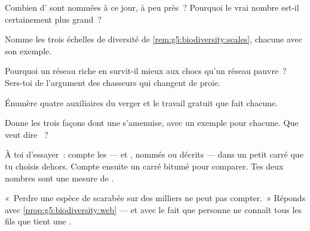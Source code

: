 \begin{exercise}[$\star$]\label{exo:g5:biodiversity:3}
Combien d' sont nommées à ce jour, à peu près~? Pourquoi le
vrai nombre est-il certainement plus grand~?
\end{exercise}

\begin{exercise}[$\star$]\label{exo:g5:biodiversity:4}
Nomme les trois échelles de diversité de
\cref{rem:g5:biodiversity:scales}, chacune avec son exemple.
\end{exercise}

\begin{exercise}[$\star$]\label{exo:g5:biodiversity:5}
Pourquoi un réseau riche en  survit-il mieux aux chocs qu'un
réseau pauvre~? Sers-toi de l'argument des chasseurs qui changent de
proie.
\end{exercise}

\begin{exercise}[$\star$]\label{exo:g5:biodiversity:6}
Énumère quatre  auxiliaires du verger et le travail gratuit
que fait chacune.
\end{exercise}

\begin{exercise}[$\star$]\label{exo:g5:biodiversity:7}
Donne les trois façons dont une  s'amenuise, avec un exemple
pour chacune. Que veut dire \emph{}~?
\end{exercise}

\begin{exercise}[$\star$]\label{exo:g5:biodiversity:8}
À toi d'essayer~: compte les  ---  et , nommés
ou décrits --- dans un petit carré que tu choisis dehors. Compte
ensuite un carré bitumé pour comparer. Tes deux nombres sont une
mesure de .
\end{exercise}

\begin{exercise}[$\star\star$]\label{exo:g5:biodiversity:9}
«~Perdre une espèce de scarabée sur des milliers ne peut pas
compter.~» Réponds avec \cref{prop:g5:biodiversity:web} --- et avec
le fait que personne ne connaît tous les fils que tient une .
\end{exercise}

